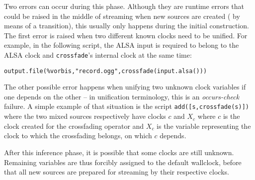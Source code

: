Two errors can occur during this phase.
Although they are runtime errors that could be raised
in the middle of streaming when new sources are created
(\eg{} by means of a transition),
this usually only happens during the initial construction.
The first error is raised when
two different known clocks need to be unified.
For example, in the following script, the ALSA input is
required to belong to the ALSA clock and \verb.crossfade.'s internal clock
at the same time:
\begin{verbatim}
output.file(%vorbis,"record.ogg",crossfade(input.alsa()))
\end{verbatim}
The other possible error happens when unifying two unknown clock variables
if one depends on the other -- in unification terminology, this is an
\emph{occurs-check} failure. A simple example of that situation is
the script \verb.add([s,crossfade(s)]). where the two mixed sources
respectively have clocks $c$ and $X_c$ where $c$ is the clock created
for the crossfading operator and $X_c$ is the variable representing
the clock to which the crossfading belongs, on which $c$ depends.

After this inference phase, it is possible that some clocks are still
unknown. Remaining variables are thus forcibly assigned to the default
wallclock, before that all new sources are prepared for streaming
by their respective clocks.
